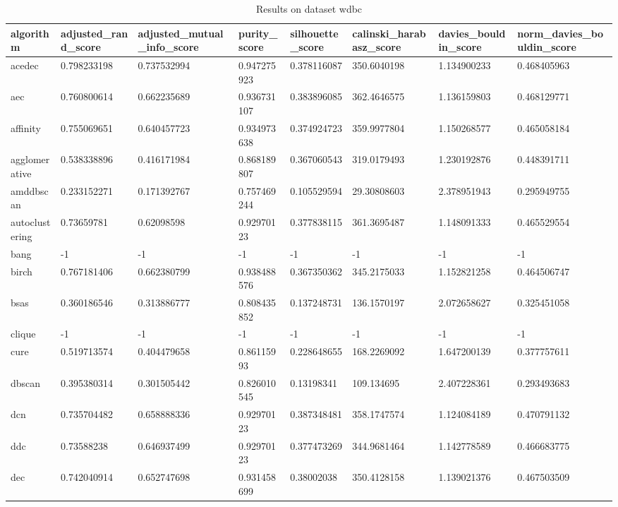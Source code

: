 \begin{table}[H]
\centering
\caption{Results on dataset wdbc}
\label{S70_Table}
\begin{tabular}{|l|l|l|l|l|l|l|l|}
\hline
algorithm & adjusted\_rand\_score & adjusted\_mutual\_info\_score & purity\_score & silhouette\_score & calinski\_harabasz\_score & davies\_bouldin\_score & norm\_davies\_bouldin\_score \\
\hline
acedec & 0.798233198 & 0.737532994 & 0.947275923 & 0.378116087 & 350.6040198 & 1.134900233 & 0.468405963 \\
\hline
aec & 0.760800614 & 0.662235689 & 0.936731107 & 0.383896085 & 362.4646575 & 1.136159803 & 0.468129771 \\
\hline
affinity & 0.755069651 & 0.640457723 & 0.934973638 & 0.374924723 & 359.9977804 & 1.150268577 & 0.465058184 \\
\hline
agglomerative & 0.538338896 & 0.416171984 & 0.868189807 & 0.367060543 & 319.0179493 & 1.230192876 & 0.448391711 \\
\hline
amddbscan & 0.233152271 & 0.171392767 & 0.757469244 & 0.105529594 & 29.30808603 & 2.378951943 & 0.295949755 \\
\hline
autoclustering & 0.73659781 & 0.62098598 & 0.92970123 & 0.377838115 & 361.3695487 & 1.148091333 & 0.465529554 \\
\hline
bang & -1 & -1 & -1 & -1 & -1 & -1 & -1 \\
\hline
birch & 0.767181406 & 0.662380799 & 0.938488576 & 0.367350362 & 345.2175033 & 1.152821258 & 0.464506747 \\
\hline
bsas & 0.360186546 & 0.313886777 & 0.808435852 & 0.137248731 & 136.1570197 & 2.072658627 & 0.325451058 \\
\hline
clique & -1 & -1 & -1 & -1 & -1 & -1 & -1 \\
\hline
cure & 0.519713574 & 0.404479658 & 0.86115993 & 0.228648655 & 168.2269092 & 1.647200139 & 0.377757611 \\
\hline
dbscan & 0.395380314 & 0.301505442 & 0.826010545 & 0.13198341 & 109.134695 & 2.407228361 & 0.293493683 \\
\hline
dcn & 0.735704482 & 0.658888336 & 0.92970123 & 0.387348481 & 358.1747574 & 1.124084189 & 0.470791132 \\
\hline
ddc & 0.73588238 & 0.646937499 & 0.92970123 & 0.377473269 & 344.9681464 & 1.142778589 & 0.466683775 \\
\hline
dec & 0.742040914 & 0.652747698 & 0.931458699 & 0.38002038 & 350.4128158 & 1.139021376 & 0.467503509 \\

\end{tabular}
\end{table}
